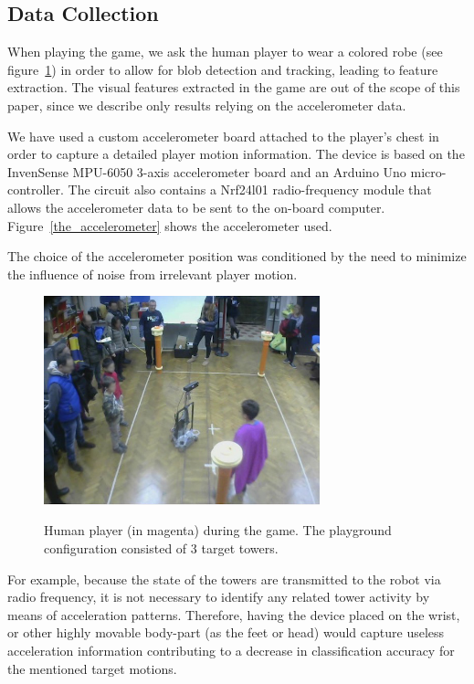 \subsection{Data Collection}\label{datacollection}

When playing the game, we ask the human player to wear a colored robe (see figure~\ref{game}) in order to allow for blob detection and tracking, leading to feature extraction. The visual features extracted in the game are out of the scope of this paper, since we describe only results relying on the accelerometer data.

We have used a custom accelerometer board attached to the player's chest in order to capture a detailed player motion information. The device is based on the InvenSense MPU-6050 3-axis accelerometer board and an Arduino Uno micro-controller. The circuit also contains a Nrf24l01 radio-frequency module that allows the accelerometer data to be sent to the on-board computer. Figure~\ref{the_accelerometer} shows the accelerometer used.

The choice of the accelerometer position was conditioned by the need to minimize the influence of noise from irrelevant player motion.

\begin{figure}[thpb]
      \centering
      {\includegraphics[width=8cm]{images/04-activity/event.jpg}}
      \caption{Human player (in magenta) during the game. The playground configuration consisted of 3 target towers.}
      \label{game}
\end{figure}

For example, because the state of the towers are transmitted to the robot via radio frequency, it is not necessary to identify any related tower activity by means of acceleration patterns. Therefore, having the device placed on the wrist, or other highly movable body-part (as the feet or head) would capture useless acceleration information contributing to a decrease in classification accuracy for the mentioned target motions. 

